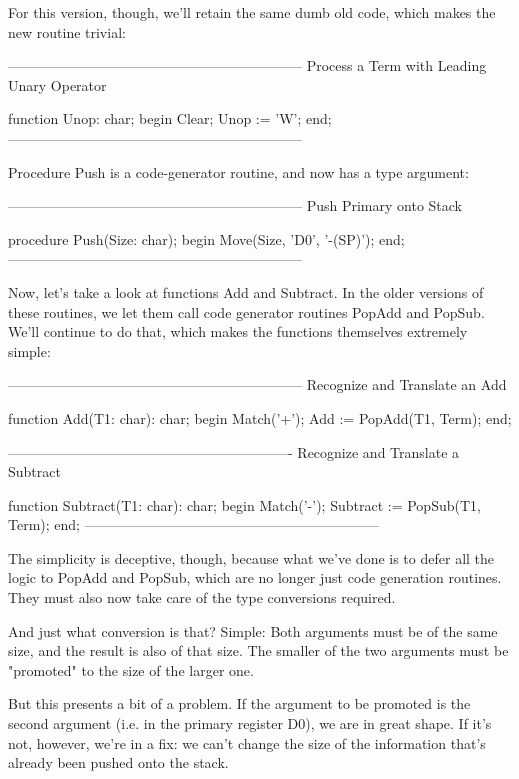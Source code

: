 \documentclass[float=false, crop=false]{standalone}
\begin{document}
For this version, though, we'll retain the same dumb old code, which makes the
new routine trivial:


{---------------------------------------------------------------}
{ Process a Term with Leading Unary Operator }

function Unop: char;
begin
   Clear;
   Unop := 'W';
end;
{---------------------------------------------------------------}


Procedure Push is a code-generator routine, and now has a type argument:


{---------------------------------------------------------------}
{ Push Primary onto Stack }

procedure Push(Size: char);
begin
   Move(Size, 'D0', '-(SP)');
end;
{---------------------------------------------------------------}


Now, let's take a look at functions Add and Subtract. In the older versions of
these routines, we let them call code generator routines PopAdd and PopSub.
We'll continue to do that, which makes the functions themselves extremely
simple:


{---------------------------------------------------------------}
{ Recognize and Translate an Add }

function Add(T1: char): char;
begin
   Match('+');
   Add := PopAdd(T1, Term);
end;


{-------------------------------------------------------------}
{ Recognize and Translate a Subtract }

function Subtract(T1: char): char;
begin
   Match('-');
   Subtract := PopSub(T1, Term);
end;
{---------------------------------------------------------------}


The simplicity is deceptive, though, because what we've done is to defer all the
logic to PopAdd and PopSub, which are no longer just code generation routines.
They must also now take care of the type conversions required.

And just what conversion is that? Simple: Both arguments must be of the same
size, and the result is also of that size. The smaller of the two arguments must
be "promoted" to the size of the larger one.

But this presents a bit of a problem. If the argument to be promoted is the
second argument (i.e. in the primary register D0), we are in great shape. If
it's not, however, we're in a fix: we can't change the size of the information
that's already been pushed onto the stack.
\end{document}
